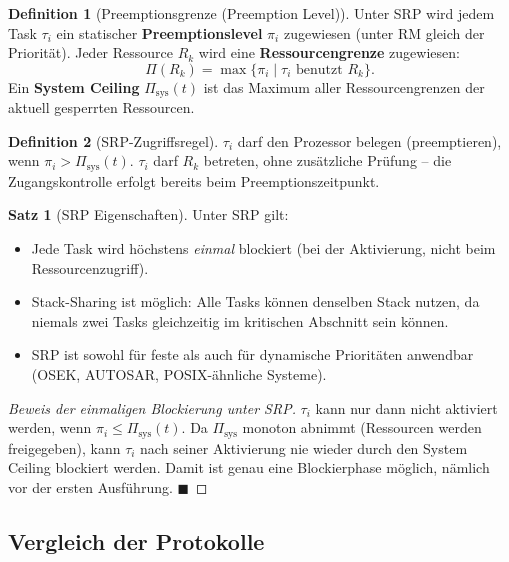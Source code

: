 ﻿\documentclass[a4paper,12pt]{report}
\theoremstyle{definition}
\newtheorem{definition}{Definition}[chapter]
\newtheorem{satz}{Satz}[chapter]
\begin{document}
\begin{definition}[Preemptionsgrenze (Preemption Level)]
	Unter SRP wird jedem Task $\tau_i$ ein statischer \textbf{Preemptionslevel}
	$\pi_i$ zugewiesen (unter RM gleich der Priorität). Jeder Ressource $R_k$ wird
	eine \textbf{Ressourcengrenze} zugewiesen:
	\[
		\Pi(R_k) = \max\{\pi_i \mid \tau_i \text{ benutzt } R_k\}.
	\]
	Ein \textbf{System Ceiling} $\Pi_{\text{sys}}(t)$ ist das Maximum aller
	Ressourcengrenzen der aktuell gesperrten Ressourcen.
\end{definition}

\begin{definition}[SRP-Zugriffsregel]
	$\tau_i$ darf den Prozessor belegen (preemptieren), wenn $\pi_i > \Pi_{\text{sys}}(t)$.
	$\tau_i$ darf $R_k$ betreten, ohne zusätzliche Prüfung -- die Zugangskontrolle
	erfolgt bereits beim Preemptionszeitpunkt.
\end{definition}

\begin{satz}[SRP Eigenschaften]
	Unter SRP gilt:
	\begin{itemize}
		\item Jede Task wird höchstens \emph{einmal} blockiert (bei der Aktivierung,
		      nicht beim Ressourcenzugriff).
		\item Stack-Sharing ist möglich: Alle Tasks können denselben Stack nutzen,
		      da niemals zwei Tasks gleichzeitig im kritischen Abschnitt sein können.
		\item SRP ist sowohl für feste als auch für dynamische Prioritäten anwendbar
		      (OSEK, AUTOSAR, POSIX-ähnliche Systeme).
	\end{itemize}
\end{satz}

\begin{proof}[Beweis der einmaligen Blockierung unter SRP]
	$\tau_i$ kann nur dann nicht aktiviert werden, wenn $\pi_i \leq \Pi_{\text{sys}}(t)$.
	Da $\Pi_{\text{sys}}$ monoton abnimmt (Ressourcen werden freigegeben), kann
	$\tau_i$ nach seiner Aktivierung nie wieder durch den System Ceiling blockiert
	werden. Damit ist genau eine Blockierphase möglich, nämlich vor der ersten
	Ausführung. \hfill$\blacksquare$
\end{proof}

\subsection{Vergleich der Protokolle}
\end{document}
